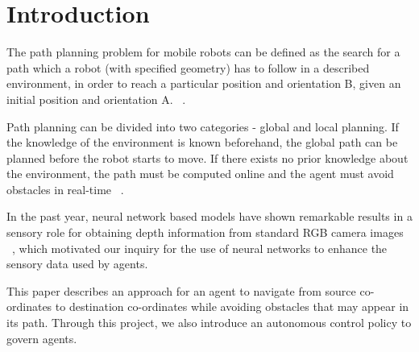 \section{Introduction}
The path planning problem for mobile robots can be defined as the search for a path which a robot (with specified geometry) has to follow in a described environment, in order to reach a particular position and orientation B, given an initial position and orientation A. ~\cite{Buniyamin_2011_IJSAED}.

Path planning can be divided into two categories - global and local planning. If the knowledge of the environment is known beforehand, the global path can be planned before the robot starts to move. If there exists no prior knowledge about the environment, the path must be computed online and the agent must avoid obstacles in real-time ~\cite{Buniyamin_2010_ICOSSSE}.

In the past year, neural network based models have shown remarkable results in a sensory role for obtaining depth information from standard RGB camera images ~\cite{Liu_2015_CVPR}, which motivated our inquiry for the use of neural networks to enhance the sensory data used by agents.

This paper describes an approach for an agent to navigate from source co-ordinates to destination co-ordinates while avoiding obstacles that may appear in its path. Through this project, we also introduce an autonomous control policy to govern agents.

